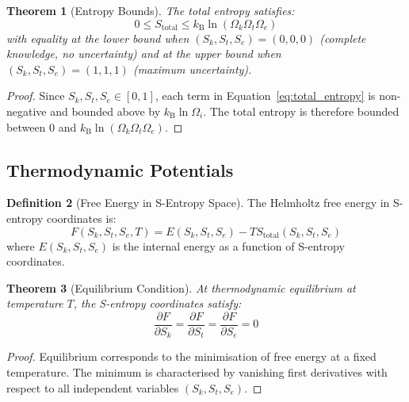 \documentclass[11pt,twocolumn,a4paper]{article}
\newtheorem{theorem}{Theorem}[section]
\theoremstyle{definition}
\newtheorem{definition}[theorem]{Definition}
\theoremstyle{remark}
\newcommand{\kB}{k_{\mathrm{B}}}
\newcommand{\Sk}{S_k}
\newcommand{\St}{S_t}
\newcommand{\Se}{S_e}
\begin{document}
\begin{theorem}[Entropy Bounds]
\label{thm:entropy_bounds}
The total entropy satisfies:
\begin{equation}
0 \leq S_{\mathrm{total}} \leq \kB \ln(\Omega_k \Omega_t \Omega_e)
\label{eq:entropy_bounds}
\end{equation}
with equality at the lower bound when $(\Sk,\St,\Se) = (0,0,0)$ (complete knowledge, no uncertainty) and at the upper bound when $(\Sk,\St,\Se) = (1,1,1)$ (maximum uncertainty).
\end{theorem}

\begin{proof}
Since $\Sk, \St, \Se \in [0,1]$, each term in Equation~\eqref{eq:total_entropy} is non-negative and bounded above by $\kB \ln\Omega_i$. The total entropy is therefore bounded between $0$ and $\kB \ln(\Omega_k \Omega_t \Omega_e)$.
\end{proof}

\subsection{Thermodynamic Potentials}

\begin{definition}[Free Energy in S-Entropy Space]
\label{def:free_energy_s}
The Helmholtz free energy in S-entropy coordinates is:
\begin{equation}
F(\Sk,\St,\Se,T) = E(\Sk,\St,\Se) - T S_{\mathrm{total}}(\Sk,\St,\Se)
\label{eq:free_energy_s}
\end{equation}
where $E(\Sk,\St,\Se)$ is the internal energy as a function of S-entropy coordinates.
\end{definition}

\begin{theorem}[Equilibrium Condition]
\label{thm:equilibrium_s}
At thermodynamic equilibrium at temperature $T$, the S-entropy coordinates satisfy:
\begin{equation}
\frac{\partial F}{\partial \Sk} = \frac{\partial F}{\partial \St} = \frac{\partial F}{\partial \Se} = 0
\label{eq:equilibrium_condition}
\end{equation}
\end{theorem}

\begin{proof}
Equilibrium corresponds to the minimisation of free energy at a fixed temperature. The minimum is characterised by vanishing first derivatives with respect to all independent variables $(\Sk,\St,\Se)$.
\end{proof}
\end{document}
